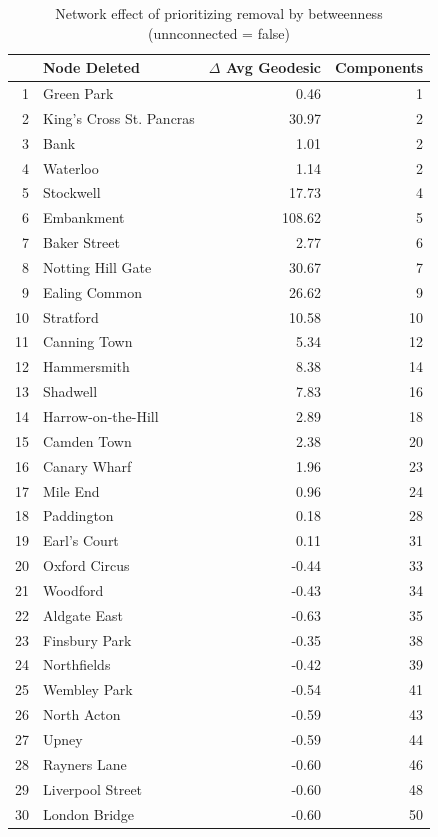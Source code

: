 \documentclass[11pt]{article} %
\begin{document}
\begin{table}[htbp]
\centering
\begin{tabular}{|r|l|r|r|}
\hline
\multicolumn{1}{|l|}{} & Node Deleted & \multicolumn{1}{l|}{$\Delta$ Avg Geodesic} & \multicolumn{1}{l|}{Components} \\ \hline
1 & Green Park & 0.46 & 1 \\ 
2 & King's Cross St. Pancras & 30.97 & 2 \\ 
3 & Bank & 1.01 & 2 \\ 
4 & Waterloo & 1.14 & 2 \\ 
5 & Stockwell & 17.73 & 4 \\ 
6 & Embankment & 108.62 & 5 \\ 
7 & Baker Street & 2.77 & 6 \\ 
8 & Notting Hill Gate & 30.67 & 7 \\ 
9 & Ealing Common & 26.62 & 9 \\ 
10 & Stratford & 10.58 & 10 \\ 
11 & Canning Town & 5.34 & 12 \\ 
12 & Hammersmith & 8.38 & 14 \\ 
13 & Shadwell & 7.83 & 16 \\ 
14 & Harrow-on-the-Hill & 2.89 & 18 \\ 
15 & Camden Town & 2.38 & 20 \\ 
16 & Canary Wharf & 1.96 & 23 \\ 
17 & Mile End & 0.96 & 24 \\ 
18 & Paddington & 0.18 & 28 \\ 
19 & Earl's Court & 0.11 & 31 \\ 
20 & Oxford Circus & -0.44 & 33 \\ 
21 & Woodford & -0.43 & 34 \\ 
22 & Aldgate East & -0.63 & 35 \\ 
23 & Finsbury Park & -0.35 & 38 \\ 
24 & Northfields & -0.42 & 39 \\ 
25 & Wembley Park & -0.54 & 41 \\ 
26 & North Acton & -0.59 & 43 \\ 
27 & Upney & -0.59 & 44 \\ 
28 & Rayners Lane & -0.60 & 46 \\ 
29 & Liverpool Street & -0.60 & 48 \\ 
30 & London Bridge & -0.60 & 50 \\ \hline
\end{tabular}
\caption{Network effect of prioritizing removal by betweenness \\ (unnconnected = false)}
\label{betweenness false}
\end{table}
\end{document}
